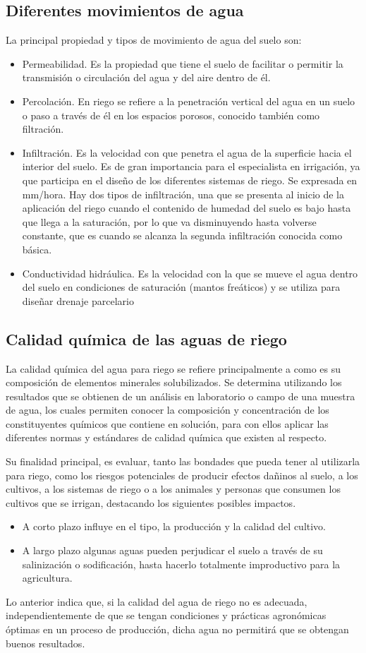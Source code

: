 \subsection{Diferentes movimientos de agua}
La principal propiedad y tipos de movimiento de agua del suelo son:
\begin{itemize}
\item Permeabilidad. Es la propiedad que tiene el suelo de facilitar o permitir la transmisión o circulación del agua y del aire dentro de él.
\item Percolación. En riego se refiere a la penetración vertical del agua en un suelo o paso a través de él en los espacios porosos, conocido también como filtración.
\item Infiltración. Es la velocidad con que penetra el agua de la superficie hacia el interior del suelo. Es de gran importancia para el especialista en irrigación, ya que participa en el diseño de los diferentes sistemas de riego. Se expresada en mm/hora. Hay dos tipos de infiltración, una que se presenta al inicio de la aplicación del riego cuando el contenido de humedad del suelo es bajo hasta que llega a la saturación, por lo que va disminuyendo hasta volverse constante, que es cuando se alcanza la segunda infiltración conocida como básica.
\item Conductividad hidráulica. Es la velocidad con la que se mueve el agua dentro del suelo en condiciones de saturación (mantos freáticos) y se utiliza para diseñar drenaje parcelario
\end{itemize}
\subsection{Calidad química de las aguas de riego}
La calidad química del agua para riego se refiere principalmente a como es su composición de elementos minerales solubilizados. Se determina utilizando los resultados que se obtienen de un análisis en laboratorio o campo de una muestra de agua, los cuales permiten conocer la composición y concentración de los constituyentes químicos que contiene en solución, para con ellos aplicar las diferentes normas y estándares de calidad química que existen al respecto.

Su finalidad principal, es evaluar, tanto las bondades que pueda tener al utilizarla para riego, como los riesgos potenciales de producir efectos dañinos al suelo, a los cultivos, a los sistemas de riego o a los animales y personas que consumen los cultivos que se irrigan, destacando los siguientes posibles impactos.
\begin{itemize}
  \item A corto plazo influye en el tipo, la producción y la calidad del cultivo.
  \item A largo plazo algunas aguas pueden perjudicar el suelo a través de su salinización o sodificación, hasta hacerlo totalmente improductivo para la agricultura.
\end{itemize}
Lo anterior indica que, si la calidad del agua de riego no es adecuada, independientemente de que se tengan condiciones y prácticas agronómicas óptimas en un proceso de producción, dicha agua no permitirá que se obtengan buenos resultados.

